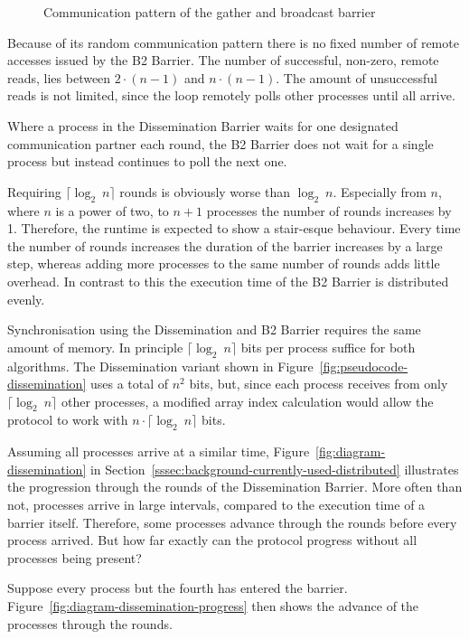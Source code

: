 \documentclass[a4paper, 10pt]{article}
\begin{document}
\begin{figure}[htbp]
	\centering
	
	\caption{Communication pattern of the gather and broadcast barrier}
	\label{fig:diagram-gather-broadcast}
\end{figure}

Because of its random communication pattern there is no fixed number of remote accesses issued by the B2 Barrier. The number of successful, non-zero, remote reads, lies between $2 \cdot (n-1)$ and $n \cdot (n-1)$. The amount of unsuccessful reads is not limited, since the loop remotely polls other processes until all arrive.

Where a process in the Dissemination Barrier waits for one designated communication partner each round, the B2 Barrier does not wait for a single process but instead continues to poll the next one.

Requiring $\lceil \log _2~n \rceil$ rounds is obviously worse than $\log _2~n$. Especially from $n$, where $n$ is a power of two, to $n+1$ processes the number of rounds increases by 1. Therefore, the runtime is expected to show a stair-esque behaviour. Every time the number of rounds increases the duration of the barrier increases by a large step, whereas adding more processes to the same number of rounds adds little overhead.
In contrast to this the execution time of the B2 Barrier is distributed evenly.

Synchronisation using the Dissemination and B2 Barrier requires the same amount of memory. In principle $\lceil \log _2~n \rceil$ bits per process suffice for both algorithms. The Dissemination variant shown in Figure~\ref{fig:pseudocode-dissemination} uses a total of $n^2$ bits, but, since each process receives from only $\lceil \log _2~n \rceil$ other processes, a modified array index calculation would allow the protocol to work with $n \cdot \lceil \log _2 ~n \rceil$ bits.

Assuming all processes arrive at a similar time, Figure~\ref{fig:diagram-dissemination} in Section~\ref{sssec:background-currently-used-distributed} illustrates the progression through the rounds of the Dissemination Barrier. More often than not, processes arrive in large intervals, compared to the execution time of a barrier itself.
Therefore, some processes advance through the rounds before every process arrived.
But how far exactly can the protocol progress without all processes being present?

Suppose every process but the fourth has entered the barrier. Figure~\ref{fig:diagram-dissemination-progress} then shows the advance of the processes through the rounds.
\end{document}
